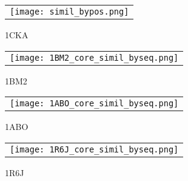     \clearpage




    \begin{figure}[h]
      \centering
      \begin{tabular}{c} 
        \texttt{[image: simil\_bypos.png]} \\
      \end{tabular}
        
      \caption{1CKA}
\label{}
    \end{figure}


    \clearpage

    \begin{figure}[h]
      \centering
      \begin{tabular}{c} 
        \texttt{[image: 1BM2\_core\_simil\_byseq.png]} \\
      \end{tabular}
\caption{1BM2}
\label{1BM2}
    \end{figure}

    \begin{figure}[h]
      \centering
      \begin{tabular}{c} 
        \texttt{[image: 1ABO\_core\_simil\_byseq.png]} \\
      \end{tabular}
      \caption{1ABO}        
\label{1ABO}
    \end{figure}

    \begin{figure}[h] 
      \centering
      \begin{tabular}{c} 
        \texttt{[image: 1R6J\_core\_simil\_byseq.png]} \\
      \end{tabular}
        
      \caption{1R6J}
\label{}
    \end{figure}

    \clearpage


